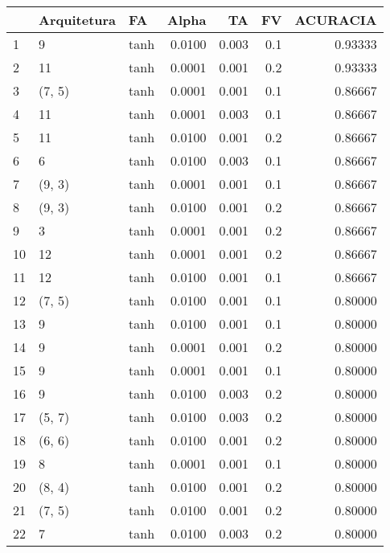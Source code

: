 \begin{tabular}{lllrrrr}
\toprule
{} & Arquitetura &        FA &   Alpha &     TA &   FV &  ACURACIA \\
\midrule
1   &           9 &      tanh &  0.0100 &  0.003 &  0.1 &   0.93333 \\
2   &          11 &      tanh &  0.0001 &  0.001 &  0.2 &   0.93333 \\
3   &      (7, 5) &      tanh &  0.0001 &  0.001 &  0.1 &   0.86667 \\
4   &          11 &      tanh &  0.0001 &  0.003 &  0.1 &   0.86667 \\
5   &          11 &      tanh &  0.0100 &  0.001 &  0.2 &   0.86667 \\
6   &           6 &      tanh &  0.0100 &  0.003 &  0.1 &   0.86667 \\
7   &      (9, 3) &      tanh &  0.0001 &  0.001 &  0.1 &   0.86667 \\
8   &      (9, 3) &      tanh &  0.0100 &  0.001 &  0.2 &   0.86667 \\
9   &           3 &      tanh &  0.0001 &  0.001 &  0.2 &   0.86667 \\
10  &          12 &      tanh &  0.0001 &  0.001 &  0.2 &   0.86667 \\
11  &          12 &      tanh &  0.0100 &  0.001 &  0.1 &   0.86667 \\
12  &      (7, 5) &      tanh &  0.0100 &  0.001 &  0.1 &   0.80000 \\
13  &           9 &      tanh &  0.0100 &  0.001 &  0.1 &   0.80000 \\
14  &           9 &      tanh &  0.0001 &  0.001 &  0.2 &   0.80000 \\
15  &           9 &      tanh &  0.0001 &  0.001 &  0.1 &   0.80000 \\
16  &           9 &      tanh &  0.0100 &  0.003 &  0.2 &   0.80000 \\
17  &      (5, 7) &      tanh &  0.0100 &  0.003 &  0.2 &   0.80000 \\
18  &      (6, 6) &      tanh &  0.0100 &  0.001 &  0.2 &   0.80000 \\
19  &           8 &      tanh &  0.0001 &  0.001 &  0.1 &   0.80000 \\
20  &      (8, 4) &      tanh &  0.0100 &  0.001 &  0.2 &   0.80000 \\
21  &      (7, 5) &      tanh &  0.0100 &  0.001 &  0.2 &   0.80000 \\
22  &           7 &      tanh &  0.0100 &  0.003 &  0.2 &   0.80000 \\

\end{tabular}
